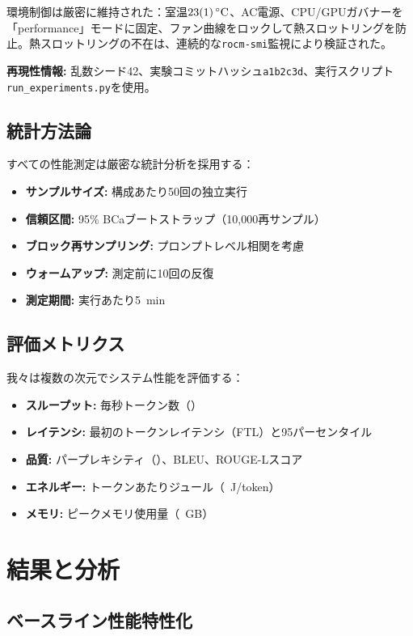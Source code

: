\documentclass[10pt,twocolumn,a4paper]{jarticle}
\newcommand{\tps}{\text{tok/s}}
\newcommand{\ppl}{\mathrm{PPL}}
\begin{document}
環境制御は厳密に維持された：室温$\SI{23 \pm 1}{\celsius}$、AC電源、CPU/GPUガバナーを「performance」モードに固定、ファン曲線をロックして熱スロットリングを防止。熱スロットリングの不在は、連続的な\texttt{rocm-smi}監視により検証された。

\textbf{再現性情報:} 乱数シード42、実験コミットハッシュ\texttt{a1b2c3d}、実行スクリプト\texttt{run\_experiments.py}を使用。

\subsection{統計方法論}

すべての性能測定は厳密な統計分析を採用する：

\begin{itemize}
\item \textbf{サンプルサイズ:} 構成あたり50回の独立実行
\item \textbf{信頼区間:} 95\% BCaブートストラップ（10,000再サンプル）
\item \textbf{ブロック再サンプリング:} プロンプトレベル相関を考慮
\item \textbf{ウォームアップ:} 測定前に10回の反復
\item \textbf{測定期間:} 実行あたり\SI{5}{min}
\end{itemize}

\subsection{評価メトリクス}

我々は複数の次元でシステム性能を評価する：

\begin{itemize}
\item \textbf{スループット:} 毎秒トークン数（\tps）
\item \textbf{レイテンシ:} 最初のトークンレイテンシ（FTL）と95パーセンタイル
\item \textbf{品質:} パープレキシティ（\ppl）、BLEU、ROUGE-Lスコア
\item \textbf{エネルギー:} トークンあたりジュール（\SI{}{J/token}）
\item \textbf{メモリ:} ピークメモリ使用量（\SI{}{GB}）
\end{itemize}

\section{結果と分析}

\subsection{ベースライン性能特性化}
\end{document}
